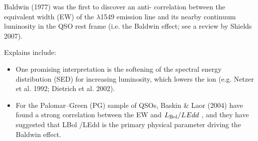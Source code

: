 

Baldwin (1977) was the first to discover an anti- correlation between the equivalent width (EW) of the \civ $\lambda$1549 emission line and its nearby continuum luminosity in the QSO rest frame (i.e. the Baldwin effect; see a review by Shields 2007). 

Explains include:
\begin{itemize}

\item One promising interpretation is the softening of the spectral energy distribution (SED) for increasing luminosity, which lowers the ion (e.g. Netzer et al. 1992; Dietrich et al. 2002).

\item For the Palomar–Green (PG) sample of QSOs, Baskin \& Laor (2004) have found a strong correlation between the \civ EW and $L_{\rm Bol} /L_{\rm} Edd$ , and they have suggested that LBol /LEdd is the primary physical parameter driving the Baldwin effect. 

\end{itemize}